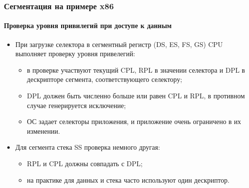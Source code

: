 \begin{frame}
\frametitle{Сегментация на примере x86}
\framesubtitle{Проверка уровня привилегий при доступе к данным}
\begin{itemize}
  \item При загрузке селектора в сегментный регистр (DS, ES, FS, GS) CPU
  выполняет проверку уровня привелегий:
  \begin{itemize}
    \item в проверке участвуют текущий CPL, RPL в значении селектора и DPL в
    дескрипторе сегмента, соответствующего селектору;
    \item DPL должен быть численно больше или равен CPL и RPL, в противном
    случае генерируется исключение;
    \item ОС задает селекторы приложения, и приложение очень ограничено в их
    изменении.
  \end{itemize}
  \item Для сегмента стека SS проверка немного другая:
  \begin{itemize}
    \item RPL и CPL должны совпадать с DPL;
    \item на практике для данных и стека часто используют один дескриптор.
  \end{itemize}
\end{itemize}
\end{frame}
